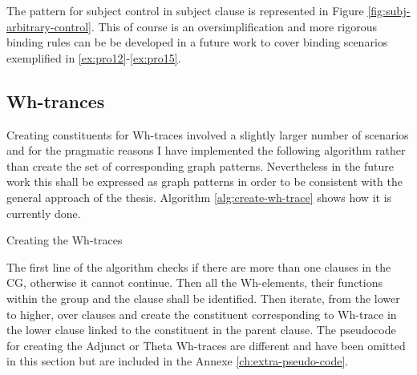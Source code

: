 The pattern for subject control in subject clause  is represented in Figure \ref{fig:subj-arbitrary-control}. This of course is an oversimplification and more rigorous binding rules can be be developed in a future work to cover binding scenarios exemplified in \ref{ex:pro12}-\ref{ex:pro15}.

\subsection{Wh-trances}
Creating constituents for Wh-traces involved a slightly larger number of scenarios and for the pragmatic reasons I have implemented the following algorithm rather than create the set of corresponding graph patterns. Nevertheless in the future work this shall be expressed as graph patterns in order to be consistent with the general approach of the thesis. Algorithm \ref{alg:create-wh-trace} shows how it is currently done.

\begin{algorithm}[!ht]
	\Input { \cg}
	\caption{Creating the Wh-traces}
	\label{alg:create-wh-trace}
\end{algorithm}

The first line of the algorithm checks if there are more than one clauses in the CG, otherwise it cannot continue. Then all the Wh-elements, their functions within the group and the clause shall be identified. Then iterate, from the lower to higher, over clauses and create the constituent corresponding to Wh-trace in the lower clause linked to the constituent in the parent clause. The pseudocode for creating the Adjunct or Theta Wh-traces are different and have been omitted in this section but are included in the Annexe \ref{ch:extra-pseudo-code}. 

